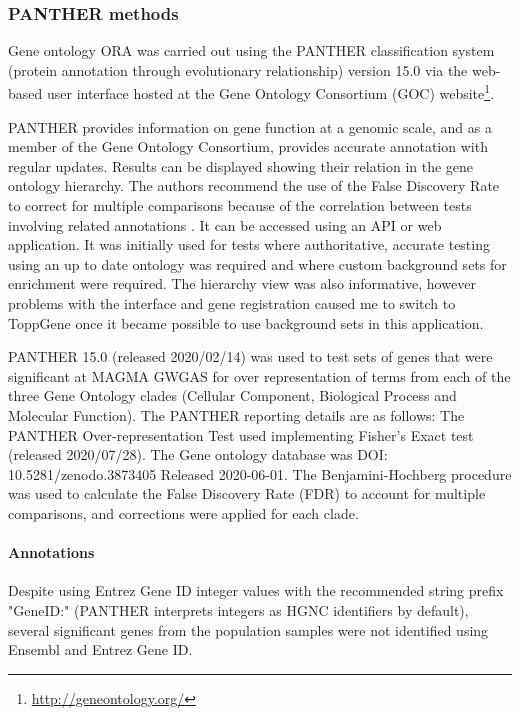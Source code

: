 \subsubsection{PANTHER methods}
\label{sec:panther methods1}
\label{sec:methods GO Pather}
Gene ontology ORA was carried out using the PANTHER classification system (protein annotation through evolutionary relationship) version 15.0\cite{mi2019protocol} via the web-based user interface hosted at the Gene Ontology Consortium (GOC) website\footnote{\url{http://geneontology.org/}}.

PANTHER provides information on gene function at a genomic scale, and as a member of the Gene Ontology Consortium, provides accurate annotation with regular updates. Results can be displayed showing their relation in the gene ontology hierarchy\cite{mi2019protocol}.  The authors recommend the use of the False Discovery Rate to correct for multiple comparisons because of the correlation between tests involving related annotations \cite{mi2019protocol}. It can be accessed using an API or web application. It was initially used for tests where authoritative, accurate testing using an up to date ontology was required and where custom background sets for enrichment were required. The hierarchy view was also informative, however problems with the interface and gene registration caused me to switch to ToppGene once it became possible to use background sets in this application.

PANTHER 15.0 (released 2020/02/14)\cite{mi2013large} was used to test sets of genes that were significant at MAGMA GWGAS for over representation of terms from each of the three Gene Ontology clades (Cellular Component, Biological Process and Molecular Function). The PANTHER reporting details are as follows: The PANTHER Over-representation Test used implementing Fisher's Exact test (released 2020/07/28).  The Gene ontology database was DOI: 10.5281/zenodo.3873405 Released 2020-06-01.  The Benjamini-Hochberg procedure \cite{benjamini1995controlling} was used to calculate the False Discovery Rate (FDR) to account for multiple comparisons, and corrections  were applied for each clade.

\paragraph{Annotations}

Despite using Entrez Gene ID integer values with the recommended string prefix "GeneID:" (PANTHER interprets integers as HGNC identifiers by default), several significant genes from the population samples were not identified using Ensembl and Entrez Gene ID. 

